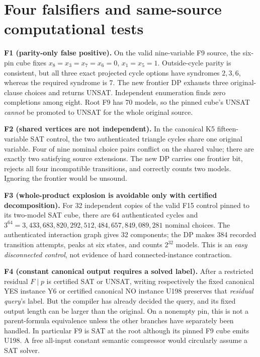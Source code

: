 \documentclass[11pt]{article}
\begin{document}
\section{Four falsifiers and same-source computational tests}
\noindent\textbf{F1 (parity-only false positive).} On the valid nine-variable F9 source, the six-pin cube fixes $x_8=x_3=x_7=x_6=0$, $x_1=x_5=1$. Outside-cycle parity is consistent, but all three exact projected cycle options have syndromes $2,3,6$, whereas the required syndrome is $7$. The new frontier DP exhausts three original-clause choices and returns UNSAT. Independent enumeration finds zero completions among eight. Root F9 has 70 models, so the pinned cube's UNSAT \emph{cannot} be promoted to UNSAT for the whole original source.

\noindent\textbf{F2 (shared vertices are not independent).} In the canonical K5 fifteen-variable SAT control, the two authenticated triangle cycles share one original variable. Four of nine nominal choice pairs conflict on the shared value; there are exactly two satisfying source extensions. The new DP carries one frontier bit, rejects all four incompatible transitions, and correctly counts two models. Ignoring the frontier would be unsound.

\noindent\textbf{F3 (whole-product explosion is avoidable only with certified decomposition).} For 32 independent copies of the valid F15 control pinned to its two-model SAT cube, there are $64$ authenticated cycles and $3^{64}=3{,}433{,}683{,}820{,}292{,}512{,}484{,}657{,}849{,}089{,}281$ nominal choices. The authenticated interaction graph gives 32 components; the DP makes 384 recorded transition attempts, peaks at six states, and counts $2^{32}$ models. This is an \emph{easy disconnected control}, not evidence of hard connected-instance contraction.

\noindent\textbf{F4 (constant canonical output requires a solved label).} After a restricted residual $F\mid p$ is certified SAT or UNSAT, writing respectively the fixed canonical YES instance Y6 or certified canonical NO instance U198 preserves that \emph{residual query}'s label. But the compiler has already decided the query, and its fixed output length can be larger than the original. On a nonempty pin, this is not a parent-formula equivalence unless the other branches have separately been handled. In particular F9 is SAT at the root although its pinned F9 cube emits U198. A free all-input constant semantic compressor would circularly assume a SAT solver.
\end{document}
